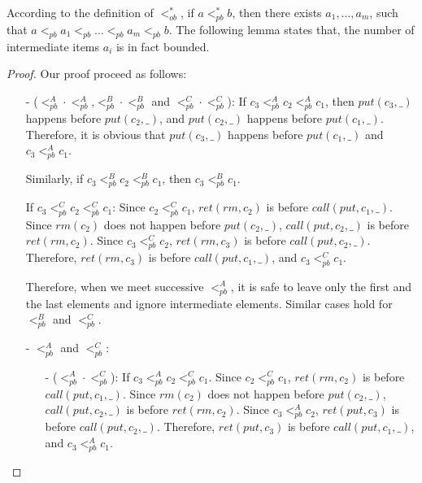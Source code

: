 


According to the definition of $<_{\textit{ob}}^*$, if $a <_{\textit{pb}}^* b$, then there exists $a_1,\ldots,a_m$, such that $a <_{\textit{pb}} a_1 <_{\textit{pb}} \ldots <_{\textit{pb}} a_m <_{\textit{pb}} b$. The following lemma states that, the number of intermediate items $a_i$ is in fact bounded.

\OBOrderHasBoundedLength*

\begin {proof}

Our proof proceed as follows:

\begin{itemize}
\setlength{\itemsep}{0.5pt}
\item[-] ($<_{\textit{pb}}^A \cdot <_{\textit{pb}}^A$,$<_{\textit{pb}}^B \cdot <_{\textit{pb}}^B$ and $<_{\textit{pb}}^C \cdot <_{\textit{pb}}^C$): If $c_3 <_{\textit{pb}}^A c_2 <_{\textit{pb}}^A c_1$, then $\textit{put}(c_3,\_)$ happens before $\textit{put}(c_2,\_)$, and $\textit{put}(c_2,\_)$ happens before $\textit{put}(c_1,\_)$. Therefore, it is obvious that $\textit{put}(c_3,\_)$ happens before $\textit{put}(c_1,\_)$ and $c_3 <_{\textit{pb}}^A c_1$.

    Similarly, if $c_3 <_{\textit{pb}}^B c_2 <_{\textit{pb}}^B c_1$, then $c_3 <_{\textit{pb}}^B c_1$.

    If $c_3 <_{\textit{pb}}^C c_2 <_{\textit{pb}}^C c_1$: Since $c_2 <_{\textit{pb}}^C c_1$, $\textit{ret}(\textit{rm},c_2)$ is before $\textit{call}(\textit{put},c_1,\_)$. Since $\textit{rm}(c_2)$ does not happen before $\textit{put}(c_2,\_)$, $\textit{call}(\textit{put},c_2,\_)$ is before $\textit{ret}(\textit{rm},c_2)$. Since $c_3 <_{\textit{pb}}^C c_2$, $\textit{ret}(\textit{rm},c_3)$ is before $\textit{call}(\textit{put},c_2,\_)$. Therefore, $\textit{ret}(\textit{rm},c_3)$ is before $\textit{call}(\textit{put},c_1,\_)$, and $c_3 <_{\textit{pb}}^C c_1$.

    Therefore, when we meet successive $<_{\textit{pb}}^A$, it is safe to leave only the first and the last elements and ignore intermediate elements. Similar cases hold for $<_{\textit{pb}}^B$ and $<_{\textit{pb}}^C$.

\item[-] $<_{\textit{pb}}^A$ and $<_{\textit{pb}}^C$:

    \begin{itemize}
    \setlength{\itemsep}{0.5pt}
    \item[-] ($<_{\textit{pb}}^A \cdot <_{\textit{pb}}^C$): If $c_3 <_{\textit{pb}}^A c_2 <_{\textit{pb}}^C c_1$. Since $c_2 <_{\textit{pb}}^C c_1$, $\textit{ret}(\textit{rm},c_2)$ is before $\textit{call}(\textit{put},c_1,\_)$. Since $\textit{rm}(c_2)$ does not happen before $\textit{put}(c_2,\_)$, $\textit{call}(\textit{put},c_2,\_)$ is before $\textit{ret}(\textit{rm},c_2)$. Since $c_3 <_{\textit{pb}}^A c_2$, $\textit{ret}(\textit{put},c_3)$ is before $\textit{call}(\textit{put},c_2,\_)$. Therefore, $\textit{ret}(\textit{put},c_3)$ is before $\textit{call}(\textit{put},c_1,\_)$, and $c_3 <_{\textit{pb}}^A c_1$.


\end{itemize}
\end{itemize}
\end{proof}
